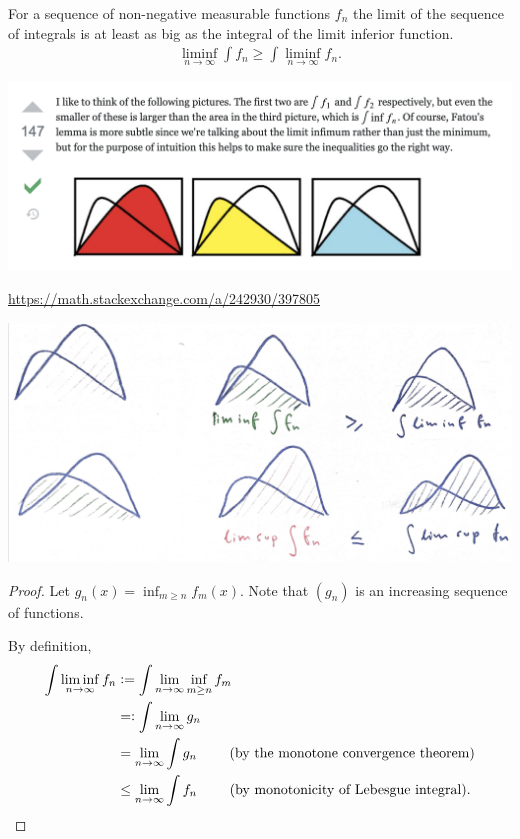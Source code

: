 \begin{theorem}
  For a sequence of non-negative measurable functions $f_n$ the limit of the sequence of integrals is at least
  as big as the integral of the limit inferior function.
  \begin{align*}
    \liminf_{n\to\infty} \int f_n \geq \int \liminf_{n\to\infty} f_n.
  \end{align*}
\end{theorem}

\begin{mdframed}
\includegraphics[width=400pt]{img/analysis--berkeley-202a--billingsley-section-1--lebesgue-integral-a3de.png}
\end{mdframed}
\url{https://math.stackexchange.com/a/242930/397805}

\begin{mdframed}
\includegraphics[width=400pt]{img/analysis--berkeley-202a--billingsley-section-1--lebesgue-integral-70e1.png}
\end{mdframed}


\begin{proof}
  Let $g_n(x) = \inf_{m\geq n}f_m(x)$. Note that $(g_n)$ is an increasing sequence of functions.

  By definition,
  \begin{align*}
    \int \liminf_{n\to\infty} f_n
    &:= \int \limn \inf_{m\geq n}f_m \\
    &=: \int \limn g_n \\
    &= \limn \int g_n ~~~~~~~\text{(by the monotone convergence theorem)}\\
    &\leq \limn \int f_n ~~~~~~~\text{(by monotonicity of Lebesgue integral)}.
  \end{align*}
\end{proof}


